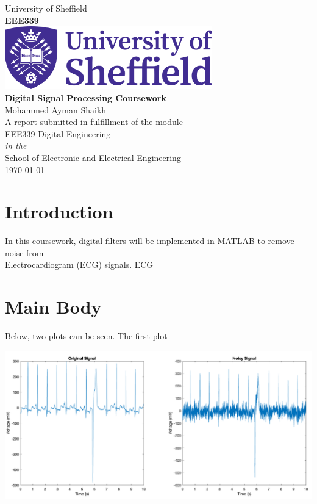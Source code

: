 \documentclass[11pt,oneside]{book}
\begin{document}
\setcounter{tocdepth}{0} 
\renewcommand\labelitemi{---}

\frontmatter

\begin{titlepage}
\begin{center}
{\LARGE University of Sheffield}\\[1.5cm]
\linespread{1.2}\Large {\bfseries EEE339}\\[2cm]
\linespread{1}
\includegraphics[width=9cm]{images/logo.png}\\[1.5cm]

\linespread{1.2}\Large {\bfseries Digital Signal Processing Coursework}\\[1cm]
{\Large Mohammed Ayman Shaikh}\\[1cm]
\large A report submitted in fulfillment of the module\\EEE339 Digital Engineering\\[0.3cm] 
\textit{in the}\\[0.3cm]
School of Electronic and Electrical Engineering\\[2cm]
\today
\end{center}

\end{titlepage}


\linespread{1.5}





\chapter{Introduction}
In this coursework, digital filters will be implemented in MATLAB to remove noise from 
\\Electrocardiogram (ECG) signals. ECG
\chapter{Main Body}
Below, two plots can be seen. The first plot
\begin{center}
\includegraphics[width=18cm]{graphics/original_noisy_side_by_side.png}
\end{center}
\end{document}
